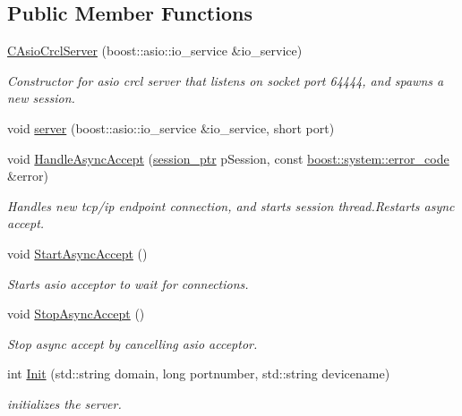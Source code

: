 \subsection*{Public Member Functions}
\begin{DoxyCompactItemize}
\item 
\hyperlink{classCAsioCrclServer_ac3f58993af64abaa77c957b8017ed740}{C\-Asio\-Crcl\-Server} (boost\-::asio\-::io\-\_\-service \&io\-\_\-service)
\begin{DoxyCompactList}\small\item\em Constructor for asio crcl server that listens on socket port 64444, and spawns a new session. \end{DoxyCompactList}\item 
void \hyperlink{classCAsioCrclServer_aa16173597e0f5fe3ec192fbf35a48e4f}{server} (boost\-::asio\-::io\-\_\-service \&io\-\_\-service, short port)
\item 
void \hyperlink{classCAsioCrclServer_ad1c2aeda8b4d1ba53cfbf630d3c0ed93}{Handle\-Async\-Accept} (\hyperlink{AsioCrclServer_8h_a392d769efe4dde887390c7ad3f104c41}{session\-\_\-ptr} p\-Session, const \hyperlink{AsioCrclServer_8h_ae1179d2a354a7cf13df4d8544a33fd4f}{boost\-::system\-::error\-\_\-code} \&error)
\begin{DoxyCompactList}\small\item\em Handles new tcp/ip endpoint connection, and starts session thread.\-Restarts async accept. \end{DoxyCompactList}\item 
void \hyperlink{classCAsioCrclServer_a38a9dad1587eabed33505c601ed75ea5}{Start\-Async\-Accept} ()
\begin{DoxyCompactList}\small\item\em Starts asio acceptor to wait for connections. \end{DoxyCompactList}\item 
void \hyperlink{classCAsioCrclServer_aeeccc0924fd65a33af79eccf74642538}{Stop\-Async\-Accept} ()
\begin{DoxyCompactList}\small\item\em Stop async accept by cancelling asio acceptor. \end{DoxyCompactList}\item 
int \hyperlink{classCAsioCrclServer_acc7f59bd4811f4ae7cc0ff753ef65707}{Init} (std\-::string domain, long portnumber, std\-::string devicename)
\begin{DoxyCompactList}\small\item\em initializes the server. \end{DoxyCompactList}\item 

\end{DoxyCompactItemize}

